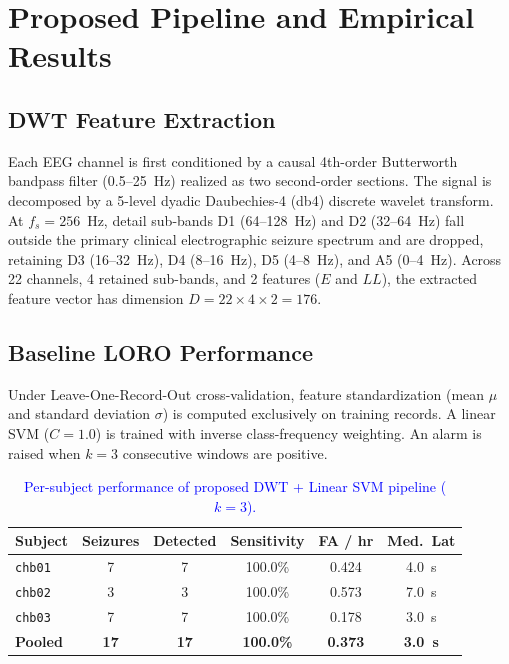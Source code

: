 \documentclass[10pt,twocolumn,letterpaper]{article}
\begin{document}
{\color{blue}
\section{Proposed Pipeline and Empirical Results}
\label{sec:proposed_results}

\subsection{DWT Feature Extraction}
Each EEG channel is first conditioned by a causal 4th-order Butterworth bandpass filter (0.5--25~Hz) realized as two second-order sections. The signal is decomposed by a 5-level dyadic Daubechies-4 (db4) discrete wavelet transform. At $f_s = 256$~Hz, detail sub-bands D1 (64--128~Hz) and D2 (32--64~Hz) fall outside the primary clinical electrographic seizure spectrum and are dropped, retaining D3 (16--32~Hz), D4 (8--16~Hz), D5 (4--8~Hz), and A5 (0--4~Hz).
Across 22 channels, 4 retained sub-bands, and 2 features ($E$ and $LL$), the extracted feature vector has dimension $D = 22 \times 4 \times 2 = 176$.

\subsection{Baseline LORO Performance}
Under Leave-One-Record-Out cross-validation, feature standardization (mean $\mu$ and standard deviation $\sigma$) is computed exclusively on training records. A linear SVM ($C=1.0$) is trained with inverse class-frequency weighting. An alarm is raised when $k=3$ consecutive windows are positive.

\begin{table}[h]
\centering
\footnotesize
\setlength{\tabcolsep}{3pt}
\color{blue}
\caption{\textcolor{blue}{Per-subject performance of proposed DWT + Linear SVM pipeline ($k=3$).}}
\label{tab:baseline_results}
\begin{tabular}{lccccc}
\toprule
\textbf{Subject} & \textbf{Seizures} & \textbf{Detected} & \textbf{Sensitivity} & \textbf{FA / hr} & \textbf{Med.\ Lat} \\
\midrule
\texttt{chb01} & 7 & 7 & 100.0\% & 0.424 & 4.0~s \\
\texttt{chb02} & 3 & 3 & 100.0\% & 0.573 & 7.0~s \\
\texttt{chb03} & 7 & 7 & 100.0\% & 0.178 & 3.0~s \\
\midrule
\textbf{Pooled} & \textbf{17} & \textbf{17} & \textbf{100.0\%} & \textbf{0.373} & \textbf{3.0~s} \\
\bottomrule
\end{tabular}
\end{table}

}
\end{document}
